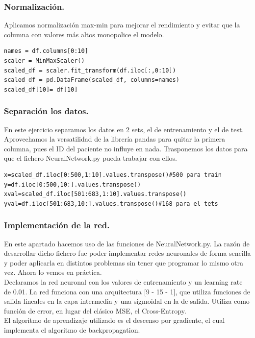 \documentclass[a4paper,11pt]{article}
\begin{document}
\subsubsection{Normalización.}
Aplicamos normalización max-min para mejorar el rendimiento y evitar que la columna con valores más altos monopolice el modelo. 
\begin{lstlisting}
names = df.columns[0:10]
scaler = MinMaxScaler() 
scaled_df = scaler.fit_transform(df.iloc[:,0:10]) 
scaled_df = pd.DataFrame(scaled_df, columns=names)
scaled_df[10]= df[10]
\end{lstlisting}
\subsubsection{Separación los datos.}
En este ejercicio separamos los datos en 2 sets, el de entrenamiento y el de test. Aprovechamos la versatilidad de la librería pandas para quitar la primera columna, pues el ID del paciente no influye en nada. Trasponemos los datos para que el fichero NeuralNetwork.py pueda trabajar con ellos.
\begin{lstlisting}
x=scaled_df.iloc[0:500,1:10].values.transpose()#500 para train
y=df.iloc[0:500,10:].values.transpose()
xval=scaled_df.iloc[501:683,1:10].values.transpose()
yval=df.iloc[501:683,10:].values.transpose()#168 para el tets
\end{lstlisting}
\subsubsection{Implementación de la red.}
En este apartado hacemos uso de las funciones de NeuralNetwork.py. La razón de desarrollar dicho fichero fue poder implementar redes neuronales de forma sencilla y poder aplicarla en distintos problemas sin tener que programar lo mismo otra vez. Ahora lo vemos en práctica.\\

\noindent
Declaramos la red neuronal con los valores de entrenamiento y un learning rate de 0.01. La red funciona con una arquitectura [9 - 15 - 1], que utiliza funciones de salida lineales en la capa intermedia y una sigmoidal en la de salida. Utiliza como función de error, en lugar del clásico MSE, el Cross-Entropy. \\

\noindent
El algoritmo de aprendizaje utilizado es el descenso por gradiente, el cual implementa el algoritmo de backpropagation.\\
\end{document}
